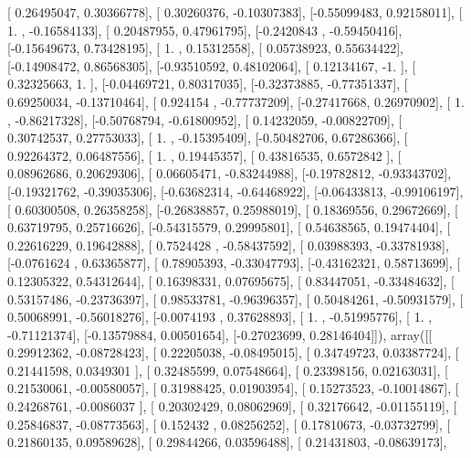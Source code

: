 \documentclass{article}
\begin{document}
       [ 0.26495047,  0.30366778],
       [ 0.30260376, -0.10307383],
       [-0.55099483,  0.92158011],
       [ 1.        , -0.16584133],
       [ 0.20487955,  0.47961795],
       [-0.2420843 , -0.59450416],
       [-0.15649673,  0.73428195],
       [ 1.        ,  0.15312558],
       [ 0.05738923,  0.55634422],
       [-0.14908472,  0.86568305],
       [-0.93510592,  0.48102064],
       [ 0.12134167, -1.        ],
       [ 0.32325663,  1.        ],
       [-0.04469721,  0.80317035],
       [-0.32373885, -0.77351337],
       [ 0.69250034, -0.13710464],
       [ 0.924154  , -0.77737209],
       [-0.27417668,  0.26970902],
       [ 1.        , -0.86217328],
       [-0.50768794, -0.61800952],
       [ 0.14232059, -0.00822709],
       [ 0.30742537,  0.27753033],
       [ 1.        , -0.15395409],
       [-0.50482706,  0.67286366],
       [ 0.92264372,  0.06487556],
       [ 1.        ,  0.19445357],
       [ 0.43816535,  0.6572842 ],
       [ 0.08962686,  0.20629306],
       [ 0.06605471, -0.83244988],
       [-0.19782812, -0.93343702],
       [-0.19321762, -0.39035306],
       [-0.63682314, -0.64468922],
       [-0.06433813, -0.99106197],
       [ 0.60300508,  0.26358258],
       [-0.26838857,  0.25988019],
       [ 0.18369556,  0.29672669],
       [ 0.63719795,  0.25716626],
       [-0.54315579,  0.29995801],
       [ 0.54638565,  0.19474404],
       [ 0.22616229,  0.19642888],
       [ 0.7524428 , -0.58437592],
       [ 0.03988393, -0.33781938],
       [-0.0761624 ,  0.63365877],
       [ 0.78905393, -0.33047793],
       [-0.43162321,  0.58713699],
       [ 0.12305322,  0.54312644],
       [ 0.16398331,  0.07695675],
       [ 0.83447051, -0.33484632],
       [ 0.53157486, -0.23736397],
       [ 0.98533781, -0.96396357],
       [ 0.50484261, -0.50931579],
       [ 0.50068991, -0.56018276],
       [-0.0074193 ,  0.37628893],
       [ 1.        , -0.51995776],
       [ 1.        , -0.71121374],
       [-0.13579884,  0.00501654],
       [-0.27023699,  0.28146404]]), array([[ 0.29912362, -0.08728423],
       [ 0.22205038, -0.08495015],
       [ 0.34749723,  0.03387724],
       [ 0.21441598,  0.0349301 ],
       [ 0.32485599,  0.07548664],
       [ 0.23398156,  0.02163031],
       [ 0.21530061, -0.00580057],
       [ 0.31988425,  0.01903954],
       [ 0.15273523, -0.10014867],
       [ 0.24268761, -0.0086037 ],
       [ 0.20302429,  0.08062969],
       [ 0.32176642, -0.01155119],
       [ 0.25846837, -0.08773563],
       [ 0.152432  ,  0.08256252],
       [ 0.17810673, -0.03732799],
       [ 0.21860135,  0.09589628],
       [ 0.29844266,  0.03596488],
       [ 0.21431803, -0.08639173],
\end{document}

